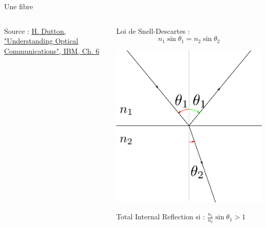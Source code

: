 \documentclass[aspectratio=149, 10pt, t]{beamer}
\begin{document}
\begin{frame}{Une fibre}
\begin{columns}
\begin{column}{0.5\linewidth}
\begin{minipage}[b]{\linewidth}
                {\footnotesize Source : \href{http://www.freeinfosociety.com/media/pdf/5475.pdf}{H. Dutton, "Understanding Optical Communications", IBM, Ch. 6}}
            \end{minipage}
        \end{column}
        \begin{column}{0.5\linewidth}
            \begin{minipage}[b]{\linewidth}
                \centering
                Loi de Snell-Descartes : $$n_1\sin\theta_1=n_2\sin\theta_2$$

                \includegraphics[height=0.3\textheight]{images/snell_descartes}

                Total Internal Reflection si : $\frac{n_1}{n_2}\sin\theta_1>1$

            \end{minipage}
        \end{column}
    \end{columns}
\end{frame}
\end{document}
